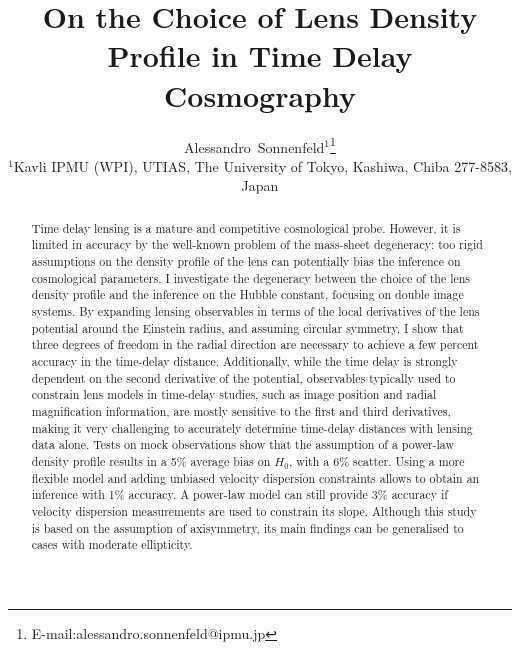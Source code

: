 \documentclass[usenatbib]{mnras}
\begin{document}
\title{On the Choice of Lens Density Profile in Time Delay Cosmography}
\author[Sonnenfeld]{
Alessandro~Sonnenfeld$^{1}$\thanks{E-mail:alessandro.sonnenfeld@ipmu.jp}
\\
$^{1}$Kavli IPMU (WPI), UTIAS, The University of Tokyo, Kashiwa, Chiba 277-8583, Japan \\
}

\maketitle

\begin{abstract}
Time delay lensing is a mature and competitive cosmological probe.
However, it is limited in accuracy by the well-known problem of the mass-sheet degeneracy:
too rigid assumptions on the density profile of the lens can potentially bias the inference on cosmological parameters.
I investigate the degeneracy between the choice of the lens density profile and the inference on the Hubble constant, focusing on double image systems.
By expanding lensing observables in terms of the local derivatives of the lens potential around the Einstein radius, and assuming circular symmetry,
I show that three degrees of freedom in the radial direction are necessary to achieve a few percent accuracy in the time-delay distance.
Additionally, while the time delay is strongly dependent on the second derivative of the potential, observables typically used to constrain lens models in time-delay studies, such as image position and radial magnification information, are mostly sensitive to the first and third derivatives, making it very challenging to accurately determine time-delay distances with lensing data alone.
Tests on mock observations show that the assumption of a power-law density profile results in a 5\% average bias on $H_0$, with a 6\% scatter.
Using a more flexible model and adding unbiased velocity dispersion constraints allows to obtain an inference with 1\% accuracy.
A power-law model can still provide 3\% accuracy if velocity dispersion measurements are used to constrain its slope.
Although this study is based on the assumption of axisymmetry, its main findings can be generalised to cases with moderate ellipticity.
\end{abstract}
\end{document}
